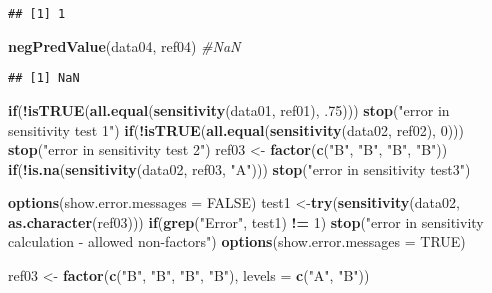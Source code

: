 \documentclass[
]{article}
\newenvironment{Shaded}{\begin{snugshade}}{\end{snugshade}}
\newcommand{\CommentTok}[1]{\textcolor[rgb]{0.56,0.35,0.01}{\textit{#1}}}
\newcommand{\ControlFlowTok}[1]{\textcolor[rgb]{0.13,0.29,0.53}{\textbf{#1}}}
\newcommand{\DataTypeTok}[1]{\textcolor[rgb]{0.13,0.29,0.53}{#1}}
\newcommand{\DecValTok}[1]{\textcolor[rgb]{0.00,0.00,0.81}{#1}}
\newcommand{\FloatTok}[1]{\textcolor[rgb]{0.00,0.00,0.81}{#1}}
\newcommand{\KeywordTok}[1]{\textcolor[rgb]{0.13,0.29,0.53}{\textbf{#1}}}
\newcommand{\NormalTok}[1]{#1}
\newcommand{\OperatorTok}[1]{\textcolor[rgb]{0.81,0.36,0.00}{\textbf{#1}}}
\newcommand{\OtherTok}[1]{\textcolor[rgb]{0.56,0.35,0.01}{#1}}
\newcommand{\StringTok}[1]{\textcolor[rgb]{0.31,0.60,0.02}{#1}}
\begin{document}
\begin{verbatim}
## [1] 1
\end{verbatim}

\begin{Shaded}
\begin{Highlighting}[]
\KeywordTok{negPredValue}\NormalTok{(data04, ref04) }\CommentTok{#NaN}
\end{Highlighting}
\end{Shaded}

\begin{verbatim}
## [1] NaN
\end{verbatim}

\begin{Shaded}
\begin{Highlighting}[]
\ControlFlowTok{if}\NormalTok{(}\OperatorTok{!}\KeywordTok{isTRUE}\NormalTok{(}\KeywordTok{all.equal}\NormalTok{(}\KeywordTok{sensitivity}\NormalTok{(data01, ref01), }\FloatTok{.75}\NormalTok{))) }\KeywordTok{stop}\NormalTok{(}\StringTok{"error in sensitivity test 1"}\NormalTok{)}
\ControlFlowTok{if}\NormalTok{(}\OperatorTok{!}\KeywordTok{isTRUE}\NormalTok{(}\KeywordTok{all.equal}\NormalTok{(}\KeywordTok{sensitivity}\NormalTok{(data02, ref02), }\DecValTok{0}\NormalTok{))) }\KeywordTok{stop}\NormalTok{(}\StringTok{"error in sensitivity test 2"}\NormalTok{)}
\NormalTok{ref03 <-}\StringTok{ }\KeywordTok{factor}\NormalTok{(}\KeywordTok{c}\NormalTok{(}\StringTok{"B"}\NormalTok{, }\StringTok{"B"}\NormalTok{, }\StringTok{"B"}\NormalTok{, }\StringTok{"B"}\NormalTok{))}
\ControlFlowTok{if}\NormalTok{(}\OperatorTok{!}\KeywordTok{is.na}\NormalTok{(}\KeywordTok{sensitivity}\NormalTok{(data02, ref03, }\StringTok{"A"}\NormalTok{))) }\KeywordTok{stop}\NormalTok{(}\StringTok{"error in sensitivity test3"}\NormalTok{)}

\KeywordTok{options}\NormalTok{(}\DataTypeTok{show.error.messages =} \OtherTok{FALSE}\NormalTok{)}
\NormalTok{test1 <-}\KeywordTok{try}\NormalTok{(}\KeywordTok{sensitivity}\NormalTok{(data02, }\KeywordTok{as.character}\NormalTok{(ref03)))}
\ControlFlowTok{if}\NormalTok{(}\KeywordTok{grep}\NormalTok{(}\StringTok{"Error"}\NormalTok{, test1) }\OperatorTok{!=}\StringTok{ }\DecValTok{1}\NormalTok{)}
  \KeywordTok{stop}\NormalTok{(}\StringTok{"error in sensitivity calculation - allowed non-factors"}\NormalTok{)}
\KeywordTok{options}\NormalTok{(}\DataTypeTok{show.error.messages =} \OtherTok{TRUE}\NormalTok{)}

\NormalTok{ref03 <-}\StringTok{ }\KeywordTok{factor}\NormalTok{(}\KeywordTok{c}\NormalTok{(}\StringTok{"B"}\NormalTok{, }\StringTok{"B"}\NormalTok{, }\StringTok{"B"}\NormalTok{, }\StringTok{"B"}\NormalTok{), }\DataTypeTok{levels =} \KeywordTok{c}\NormalTok{(}\StringTok{"A"}\NormalTok{, }\StringTok{"B"}\NormalTok{))}


\end{Highlighting}
\end{Shaded}
\end{document}
